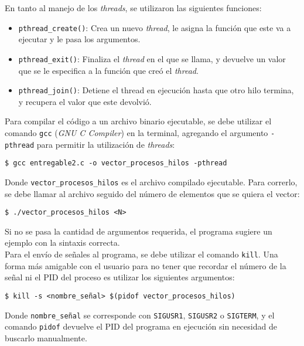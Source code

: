 En tanto al manejo de los \textit{threads}, se utilizaron las siguientes funciones:

\begin{itemize}
    \item \texttt{pthread\_create()}: Crea un nuevo \textit{thread}, le asigna la función que este va a ejecutar y le pasa los argumentos.
    \item \texttt{pthread\_exit()}: Finaliza el \textit{thread} en el que se llama, y devuelve un valor que se le especifica a la función que creó el \textit{thread}.
    \item \texttt{pthread\_join()}: Detiene el thread en ejecución hasta que otro hilo termina, y recupera el valor que este devolvió.\\
\end{itemize}

Para compilar el código a un archivo binario ejecutable, se debe utilizar el comando \texttt{gcc} (\textit{GNU C Compiler}) en la terminal, agregando el argumento \texttt{-pthread} para permitir la utilización de \textit{threads}:

\begin{center}
    \texttt{\$ gcc entregable2.c -o vector\_procesos\_hilos -pthread}
\end{center}

Donde \texttt{vector\_procesos\_hilos} es el archivo compilado ejecutable. Para correrlo, se debe llamar al archivo seguido del número de elementos que se quiera el vector:

\begin{center}
    \texttt{\$ ./vector\_procesos\_hilos <N>}
\end{center}

Si no se pasa la cantidad de argumentos requerida, el programa sugiere un ejemplo con la sintaxis correcta.\\

Para el envío de señales al programa, se debe utilizar el comando \texttt{kill}. Una forma más amigable con el usuario para no tener que recordar el número de la señal ni el PID del proceso es utilizar los siguientes argumentos:

\begin{center}
    \texttt{\$ kill -s <nombre\_señal>\ \$(pidof vector\_procesos\_hilos)}
\end{center}

Donde \texttt{nombre\_señal} se corresponde con \texttt{SIGUSR1}, \texttt{SIGUSR2} o \texttt{SIGTERM}, y el comando \texttt{pidof} devuelve el PID del programa en ejecución sin necesidad de buscarlo manualmente.\\

